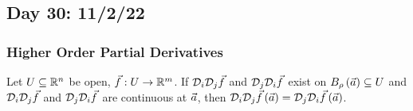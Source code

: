 \documentclass[main.tex]{subfiles}
\begin{document}
\subsection{Day 30: 11/2/22}
\subsubsection{Higher Order Partial Derivatives}

\begin{theorem}
    Let $U\subseteq \mathbb R^n$ be open, $\vec{f} : U \to \mathbb R^m$. If $\mathcal{D}_i\mathcal{D}_j\vec{f}$ and $\mathcal{D}_j\mathcal{D}_i\vec{f}$ exist on $B_\rho\left( \vec{a} \right) \subseteq U$ and $\mathcal{D}_i\mathcal{D}_j\vec{f}$ and $\mathcal{D}_j\mathcal{D}_i\vec{f}$ are continuous at $\vec{a}$, then $\mathcal{D}_i\mathcal{D}_j\vec{f}\left( \vec{a} \right) = \mathcal{D}_j\mathcal{D}_i\vec{f}\left( \vec{a} \right)$.
\end{theorem}
\end{document}
